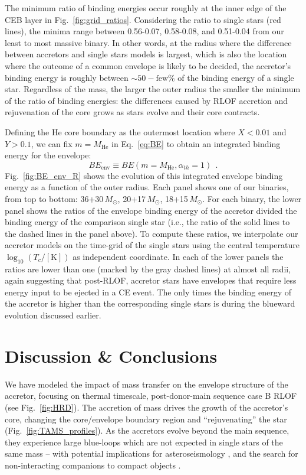 \documentclass[twocolumn,twocolappendix,trackchanges]{aastex63}
\DeclareRobustCommand{\Eqref}[1]{Eq.~\ref{#1}}
\DeclareRobustCommand{\Figref}[1]{Fig.~\ref{#1}}
\begin{document}
The minimum ratio of binding energies occur roughly at the inner edge
of the CEB layer in \Figref{fig:grid_ratios}. Considering the
ratio to single stars (red lines), the minima range between 0.56-0.07,
0.58-0.08, and 0.51-0.04 from our least to most massive binary. In
other words, at the radius where the difference between accretors and
single stars models is largest, which is also the location where the
outcome of a common envelope is likely to be decided, the accretor's
binding energy is roughly between $\sim{}50-\mathrm{few}\%$ of the
binding energy of a single star. Regardless of the mass, the larger
the outer radius the smaller the minimum of the ratio of binding
energies: the differences caused by RLOF accretion and rejuvenation of
the core grows as stars evolve and their core contracts.


Defining the He core boundary as the outermost location where $X<0.01$
and $Y>0.1$, we can fix $m=M_\mathrm{He}$ in \Eqref{eq:BE} to obtain
an integrated binding energy for the envelope:
\begin{equation}
  \label{eq:BE_env}
  BE_\mathrm{env} \equiv BE(m=M_\mathrm{He}, \alpha_{th}=1) \ \ .
\end{equation}
\Figref{fig:BE_env_R} shows the evolution of this integrated envelope
binding energy as a function of the outer radius. Each panel shows one
of our binaries, from top to bottom: 36+30\,$M_\odot$,
20+17\,$M_\odot$, 18+15\,$M_\odot$.  For each binary, the
lower panel shows the ratios of the envelope binding energy of the
accretor divided the binding energy of the comparison single star
(i.e., the ratio of the solid lines to the dashed lines in the panel
above). To compute these ratios, we interpolate our accretor models
on the time-grid of the single stars using the central temperature
$\log_{10}(T_c/[\mathrm{K}])$ as independent coordinate. In each of
the lower panels the ratios are lower than one (marked by the gray
dashed lines) at almost all radii, again suggesting that post-RLOF,
accretor stars have envelopes that require less energy input to be
ejected in a CE event. The only times the binding energy of the
accretor is higher than the corresponding single stars is during the
blueward evolution discussed earlier.

\section{Discussion \& Conclusions}
\label{sec:conclusions}

We have modeled the impact of mass transfer on the envelope structure
of the accretor, focusing on thermal timescale, post-donor-main
sequence case B RLOF (see \Figref{fig:HRD}). The accretion of mass
drives the growth of the accretor's core, changing the core/envelope
boundary region and ``rejuvenating'' the star (\Figref{fig:TAMS_profiles}). As the accretors evolve
beyond the main sequence, they experience large blue-loops which are
not expected in single stars of the same mass -- with potential
implications for asteroseismology \citep[e.g.,][]{dorn-wallenstein:20},
and the search for non-interacting companions to compact objects
\citep[e.g.,][]{breivik:17, andrews:19, chawla:21}.
\end{document}
